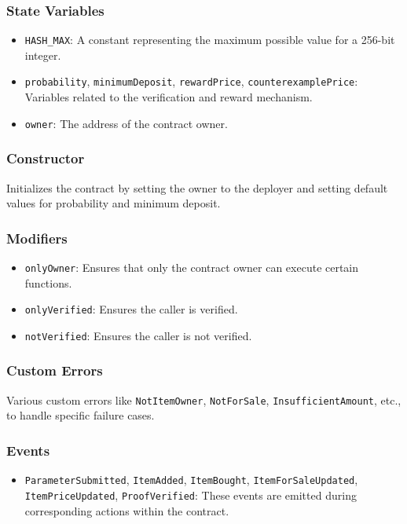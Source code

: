 \documentclass[runningheads]{llncs}
\begin{document}
\subsubsection{State Variables}
\begin{itemize}
    \item \texttt{HASH\_MAX}: A constant representing the maximum possible value for a 256-bit integer.
    \item \texttt{probability}, \texttt{minimumDeposit}, \texttt{rewardPrice}, \texttt{counterexamplePrice}: Variables related to the verification and reward mechanism.
    \item \texttt{owner}: The address of the contract owner.
\end{itemize}

\subsubsection{Constructor}
Initializes the contract by setting the owner to the deployer and setting default values for probability and minimum deposit.

\subsubsection{Modifiers}
\begin{itemize}
    \item \texttt{onlyOwner}: Ensures that only the contract owner can execute certain functions.
    \item \texttt{onlyVerified}: Ensures the caller is verified.
    \item \texttt{notVerified}: Ensures the caller is not verified.
\end{itemize}

\subsubsection{Custom Errors}
Various custom errors like \texttt{NotItemOwner}, \texttt{NotForSale}, \texttt{InsufficientAmount}, etc., to handle specific failure cases.

\subsubsection{Events}
\begin{itemize}
    \item \texttt{ParameterSubmitted}, \texttt{ItemAdded}, \texttt{ItemBought}, \texttt{ItemForSaleUpdated}, \texttt{ItemPriceUpdated}, \texttt{ProofVerified}: These events are emitted during corresponding actions within the contract.
\end{itemize}
\end{document}
